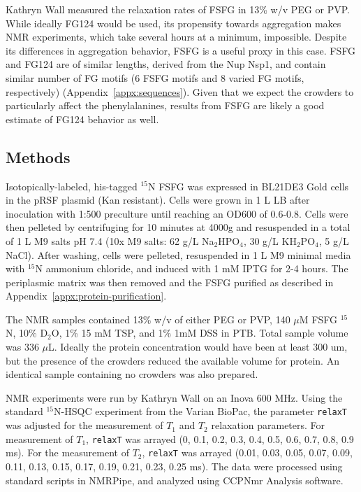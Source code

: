 Kathryn Wall measured the relaxation rates of FSFG in 13\% w/v PEG or PVP.  While ideally FG124 would be used, its propensity towards aggregation makes NMR experiments, which take several hours at a minimum, impossible.  Despite its differences in aggregation behavior, FSFG is a useful proxy in this case.  FSFG and FG124 are of similar lengths, derived from the Nup Nsp1, and contain similar number of FG motifs (6 FSFG motifs and 8 varied FG motifs, respectively) (Appendix~\ref{appx:sequences}).  Given that we expect the crowders to particularly affect the phenylalanines, results from FSFG are likely a good estimate of FG124 behavior as well.

\subsection{Methods}

Isotopically-labeled, his-tagged $^{15}$N FSFG was expressed in BL21DE3 Gold cells in the pRSF plasmid (Kan resistant).  Cells were grown in 1 L LB after inoculation with 1:500 preculture until reaching an OD600 of 0.6-0.8.  Cells were then pelleted by centrifuging for 10 minutes at 4000g and resuspended in a total of 1 L M9 salts pH 7.4 (10x M9 salts: 62 g/L Na$_2$HPO$_4$, 30 g/L KH$_2$PO$_4$, 5 g/L NaCl).  After washing, cells were pelleted, resuspended in 1 L M9 minimal media with $^{15}$N ammonium chloride, and induced with 1 mM IPTG for 2-4 hours.  The periplasmic matrix was then removed and the FSFG purified as described in Appendix~\ref{appx:protein-purification}.


The NMR samples contained 13\% w/v of either PEG or PVP, 140 $\mu$M FSFG $^{15}$N, 10\% D$_2$O, 1\% 15 mM TSP, and 1\% 1mM DSS in PTB.  Total sample volume was 336 $\mu$L.  Ideally the protein concentration would have been at least 300 um, but the presence of the crowders reduced the available volume for protein.  An identical sample containing no crowders was also prepared.

NMR experiments were run by Kathryn Wall on an Inova 600 MHz.  Using the standard $^{15}$N-HSQC experiment from the Varian BioPac, the parameter \texttt{relaxT} was adjusted for the measurement of $T_1$ and $T_2$ relaxation parameters.  For measurement of $T_1$, \texttt{relaxT} was arrayed (0, 0.1, 0.2, 0.3, 0.4, 0.5, 0.6, 0.7, 0.8, 0.9 ms).  For the measurement of $T_2$, \texttt{relaxT} was arrayed (0.01, 0.03, 0.05, 0.07, 0.09, 0.11, 0.13, 0.15, 0.17, 0.19, 0.21, 0.23, 0.25 ms).  The data were processed using standard scripts in NMRPipe, and analyzed using CCPNmr Analysis software.  


